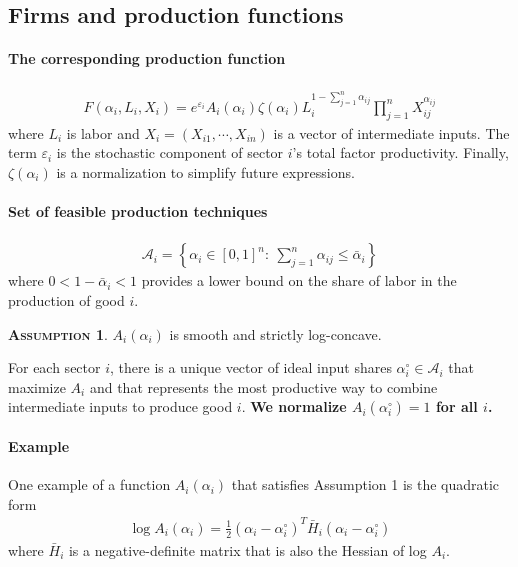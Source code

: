 \documentclass[11pt]{article}
\theoremstyle{definition}
\newtheorem{assume}{\noindent \textbf{\textsc{Assumption}}}
\begin{document}
	\subsection{Firms and production functions}
	\paragraph{The corresponding production function} 
	\begin{align}
		F(\alpha_i, L_i, X_i) = e^{\varepsilon_i} A_i(\alpha_i) \zeta(\alpha_i) L_i^{1 - \sum\limits_{j=1}^n \alpha_{ij}} \prod\limits_{j=1}^n X_{ij}^{\alpha_{ij}} \label{eq-1}
	\end{align}
	where $L_i$ is labor and $X_i = (X_{i1},\cdots, X_{in})$ is a vector of intermediate inputs. The term $\varepsilon_i$ is the stochastic component of sector $i$'s total factor productivity. Finally, $\zeta(\alpha_i)$ is a normalization to simplify future expressions.
	
	\paragraph{Set of feasible production techniques} 
	\begin{align*}
		\mathcal{A}_i = \left\lbrace \alpha_i \in [0,1]^n :\ \sum\limits_{j=1}^n \alpha_{ij} \leqslant \bar{\alpha}_i \right\rbrace
	\end{align*}
	where $0< 1 - \bar{\alpha}_i < 1$ provides a lower bound on the share of labor in the production of good $i$. 
	
	\begin{assume}
		$A_i(\alpha_i)$ is smooth and strictly log-concave.
	\end{assume}
	
	For each sector $i$, there is a unique vector of ideal input shares $\alpha_i^{\circ}\in\mathcal{A}_i$ that maximize $A_i$ and that represents the most productive way to combine intermediate inputs to produce good $i$. \textbf{We normalize $A_i(\alpha_i^{\circ}) = 1$ for all $i$.}
	
	\paragraph{Example} One example of a function $A_i(\alpha_i)$ that satisfies Assumption 1 is the quadratic form 
	\begin{align}
		\log A_i(\alpha_i) = \frac{1}{2} (\alpha_i - \alpha_i^{\circ})^{T} \bar{H}_i (\alpha_i - \alpha_i^{\circ}) \label{eq-2}
	\end{align}
	where $\bar{H}_i$ is a negative-definite matrix that is also the Hessian of log $A_i$.
	
\end{document}
